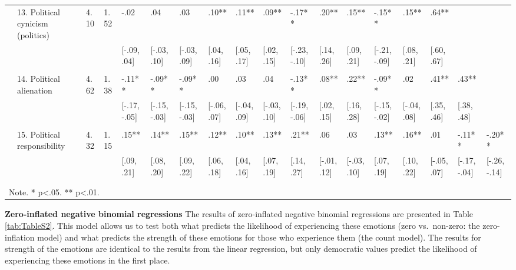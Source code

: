 \documentclass[
]{article}
\begin{document}
\begin{landscape}
\begin{table}
{\begin{tabular}[t]{llllllllllllllllll}
 & 13. Political cynicism (politics) & 4.10 & 1.52 & -.02 & .04 & .03 & .10** & .11** & .09** & -.17** & .20** & .15** & -.15** & .15** & .64** &  & \\
 &  &  &  & {}[-.09, .04] & {}[-.03, .10] & {}[-.03, .09] & {}[.04, .16] & {}[.05, .17] & {}[.02, .15] & {}[-.23, -.10] & {}[.14, .26] & {}[.09, .21] & {}[-.21, -.09] & {}[.08, .21] & {}[.60, .67] &  & \\
 &  &  &  &  &  &  &  &  &  &  &  &  &  &  &  &  & \\
 & 14. Political alienation & 4.62 & 1.38 & -.11** & -.09** & -.09** & .00 & .03 & .04 & -.13** & .08** & .22** & -.09** & .02 & .41** & .43** & \\
 &  &  &  & {}[-.17, -.05] & {}[-.15, -.03] & {}[-.15, -.03] & {}[-.06, .07] & {}[-.04, .09] & {}[-.03, .10] & {}[-.19, -.06] & {}[.02, .15] & {}[.16, .28] & {}[-.15, -.02] & {}[-.04, .08] & {}[.35, .46] & {}[.38, .48] & \\
 &  &  &  &  &  &  &  &  &  &  &  &  &  &  &  &  & \\
 & 15. Political responsibility & 4.32 & 1.15 & .15** & .14** & .15** & .12** & .10** & .13** & .21** & .06 & .03 & .13** & .16** & .01 & -.11** & -.20**\\
 &  &  &  & {}[.09, .21] & {}[.08, .20] & {}[.09, .22] & {}[.06, .18] & {}[.04, .16] & {}[.07, .19] & {}[.14, .27] & {}[-.01, .12] & {}[-.03, .10] & {}[.07, .19] & {}[.10, .22] & {}[-.05, .07] & {}[-.17, -.04] & {}[-.26, -.14]\\
 &  &  &  &  &  &  &  &  &  &  &  &  &  &  &  &  & \\
\bottomrule
\multicolumn{18}{l}{\textsuperscript{} Note. * p<.05. ** p<.01.}\\
\end{tabular}}
\end{table}
\end{landscape}

\textbf{Zero-inflated negative binomial regressions}
The results of zero-inflated negative binomial regressions are presented in Table \ref{tab:TableS2}. This model allows us to test both what predicts the likelihood of experiencing these emotions (zero vs.~non-zero: the zero-inflation model) and what predicts the strength of these emotions for those who experience them (the count model). The results for strength of the emotions are identical to the results from the linear regression, but only democratic values predict the likelihood of experiencing these emotions in the first place.
\end{document}
